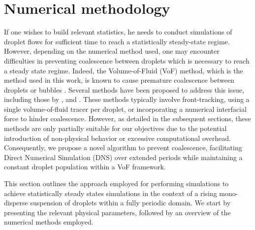 \section{Numerical methodology}
\label{sec:methodo}

If one wishes to build relevant statistics, he needs to conduct simulations of droplet flows for sufficient time to reach a statistically steady-state regime.
However, depending on the numerical method used, one may encounter difficulties in preventing coalescence between droplets which is necessary to reach a steady state regime.
Indeed, the Volume-of-Fluid (VoF) method, which is the method used in this work, is known to cause premature coalescence between droplets or bubbles \citep{innocenti2020direct}.
Several methods have been proposed to address this issue, including those by \citet{roghair2011drag,balcazar2015multiple,hidman2023assessing,zhang2023evolution}, and \citet{karnakov2022computing}.
These methods typically involve front-tracking, using a single volume-of-fluid tracer per droplet, or incorporating a numerical interfacial force to hinder coalescence. However, as detailed in the subsequent sections, these methods are only partially suitable for our objectives due to the potential introduction of non-physical behavior or excessive computational overhead. Consequently, we propose a novel algorithm to prevent coalescence, facilitating Direct Numerical Simulation (DNS) over extended periods while maintaining a constant droplet population within a VoF framework.


This section outlines the approach employed for performing simulations to achieve statistically steady states simulations in the context of a rising mono-disperse suspension of droplets within a fully periodic domain.
We start by presenting the relevant physical parameters, followed by an overview of the numerical methods employed.



